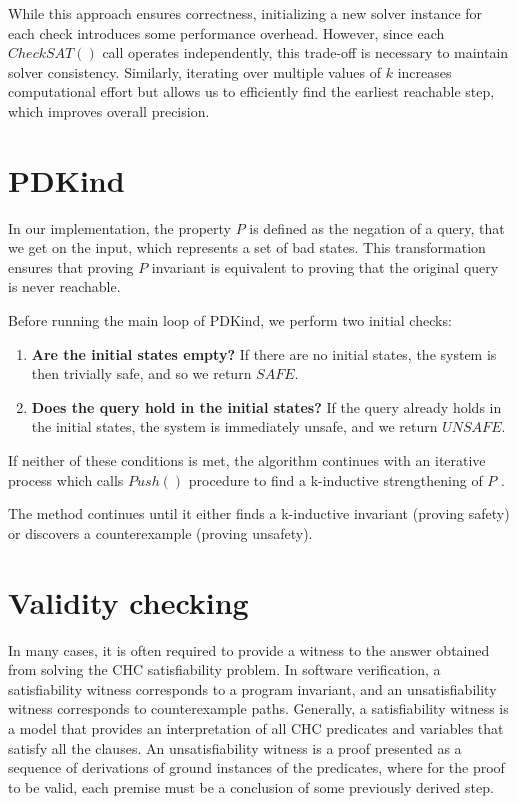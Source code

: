 While this approach ensures correctness, initializing a new solver instance for each check introduces some performance overhead. However, since each \( CheckSAT() \) call operates independently, this trade-off is necessary to maintain solver consistency. Similarly, iterating over multiple values of \( k \) increases computational effort but allows us to efficiently find the earliest reachable step, which improves overall precision.


\section{PDKind}
\noindent In our implementation, the property \( P \) is defined as the negation of a query, that
we get on the input, which represents a set of bad states. This transformation ensures that proving \( P \) invariant is equivalent to proving that the original query is never reachable.

Before running the main loop of PDKind, we perform two initial checks:
\begin{enumerate}
    \item\textbf{Are the initial states empty?} If there are no initial states, the system is then trivially safe, and so we return \( SAFE \).
    \item\textbf{Does the query hold in the initial states?} If the query already holds in the initial states, the system is immediately unsafe, and we return \( UNSAFE \).
\end{enumerate}

If neither of these conditions is met, the algorithm continues with an iterative process which calls \( Push() \) procedure to find a k-inductive strengthening of \( P \) .

The method continues until it either finds a k-inductive invariant (proving safety) or discovers a counterexample (proving unsafety).
\section{Validity checking}
\noindent In many cases, it is often required to provide a witness to the
answer obtained from solving the CHC satisfiability problem. In software
verification, a satisfiability witness corresponds to a program invariant, and
an unsatisfiability witness corresponds to counterexample paths. Generally, a
satisfiability witness is a model that provides an interpretation of all CHC
predicates and variables that satisfy all the clauses. An unsatisfiability
witness is a proof presented as a sequence of derivations of ground instances
of the predicates, where for the proof to be valid, each premise must be a
conclusion of some previously derived step.

